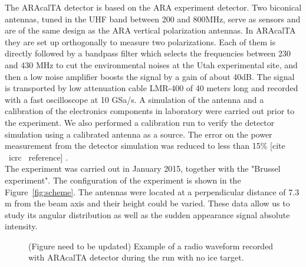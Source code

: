 \documentclass[12pt]{article}
\begin{document}
The ARAcalTA detector is based on the ARA experiment detector. Two biconical antennas, tuned in the UHF band between 200 and 800MHz, serve as sensors and are of the same design as the ARA vertical polarization antennas. In ARAcalTA they are set up orthogonally to measure two polarizations. Each of them is directly followed by a bandpass filter which selects the frequencies between 230 and  430 MHz to cut the environmental noises at the Utah experimental site, and then a low noise amplifier boosts the signal by a gain of about 40dB.  The signal is transported by low attenuation cable LMR-400 of 40 meters long and recorded with a fast oscilloscope at 10 GSa/s. A simulation of the antenna and a calibration of the electronics components in laboratory were carried out prior to the experiment. 
We also performed a calibration run to verify the detector simulation using a calibrated antenna as a source.
The error on the power measurement from the detector simulation was reduced to less than 15\% \color{red} [cite \ icrc \ reference] \color{black}. 
\\ The experiment was carried out in January 2015, together with the "Brussel experiment". 
The configuration of the experiment is shown in the Figure~\ref{fig:scheme}. 
The antennas were located at a perpendicular distance of 7.3 m from the beam axis and their height could be varied. These data allow us to study its angular distribution as well as the sudden appearance signal absolute intensity.

\begin{figure}[!h]
  \centering
  \hspace*{-3ex}
  \caption{ \color{red} (Figure need to be updated) \color{black}  Example of a radio waveform recorded with ARAcalTA detector during the run with no ice target.}
  \label{fig:waveform}
\end{figure}
\end{document}
